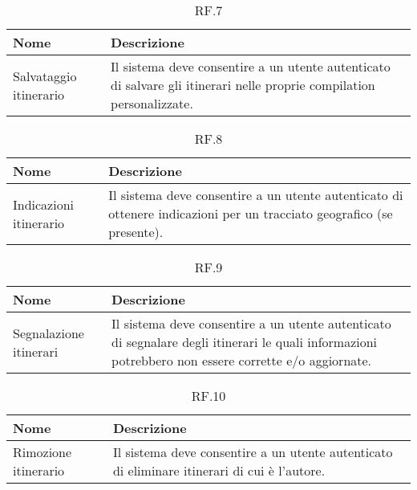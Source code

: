 \documentclass{natourDoc}
\begin{document}
	\begin{table}[H]
		\centering
		\begin{tabular}{ |p{5cm}|p{10.3cm}| }
			\hline
			\rowcolor{PineGreen!70}
			\textbf{Nome} & \textbf{Descrizione} \\
			\hline
			Salvataggio itinerario & Il sistema deve consentire a un utente autenticato di salvare gli itinerari
			nelle proprie compilation personalizzate. \\
			\hline
		\end{tabular}
		\caption{RF.7}
		\label{table:7}
	\end{table}

	\begin{table}[H]
		\centering
		\begin{tabular}{ |p{5cm}|p{10.3cm}| }
			\hline
			\rowcolor{PineGreen!70}
			\textbf{Nome} & \textbf{Descrizione} \\
			\hline
			Indicazioni itinerario & Il sistema deve consentire a un utente autenticato di ottenere indicazioni
			per un tracciato geografico (se presente). \\
			\hline
		\end{tabular}
		\caption{RF.8}
		\label{table:8}
	\end{table}

	\begin{table}[H]
		\centering
		\begin{tabular}{ |p{5cm}|p{10.3cm}| }
			\hline
			\rowcolor{PineGreen!70}
			\textbf{Nome} & \textbf{Descrizione} \\
			\hline
			Segnalazione itinerari & Il sistema deve consentire a un utente autenticato di segnalare degli itinerari
			le quali informazioni potrebbero non essere corrette e/o aggiornate. \\
			\hline
		\end{tabular}
		\caption{RF.9}
		\label{table:9}
	\end{table}

	\begin{table}[H]
		\centering
		\begin{tabular}{ |p{5cm}|p{10.3cm}| }
			\hline
			\rowcolor{PineGreen!70}
			\textbf{Nome} & \textbf{Descrizione} \\
			\hline
			Rimozione itinerario & Il sistema deve consentire a un utente autenticato di eliminare itinerari di cui
			è l'autore. \\
			\hline
		\end{tabular}
		\caption{RF.10}
		\label{table:10}
	\end{table}
	
\end{document}

